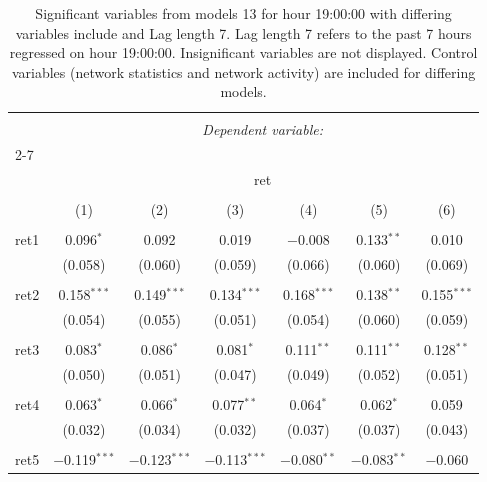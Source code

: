 
\begin{table}[!htbp] \centering 
  \caption{Significant variables from models 13 for hour 19:00:00 with differing variables include 
                               and Lag length 7. Lag length 7 refers to the past 7 hours regressed on hour 19:00:00. 
                               Insignificant variables are not displayed. 
                               Control variables (network statistics and network activity) are 
                               included for differing models.} 
  \label{RVmodels1_t_hourlagged6} 
\scriptsize 
\begin{tabular}{@{\extracolsep{5pt}}lcccccc} 
\\[-1.8ex]\hline 
\hline \\[-1.8ex] 
 & \multicolumn{6}{c}{\textit{Dependent variable:}} \\ 
\cline{2-7} 
\\[-1.8ex] & \multicolumn{6}{c}{ret} \\ 
\\[-1.8ex] & (1) & (2) & (3) & (4) & (5) & (6)\\ 
\hline \\[-1.8ex] 
 ret1 & 0.096$^{*}$ & 0.092 & 0.019 & $-$0.008 & 0.133$^{**}$ & 0.010 \\ 
  & (0.058) & (0.060) & (0.059) & (0.066) & (0.060) & (0.069) \\ 
  & & & & & & \\ 
 ret2 & 0.158$^{***}$ & 0.149$^{***}$ & 0.134$^{***}$ & 0.168$^{***}$ & 0.138$^{**}$ & 0.155$^{***}$ \\ 
  & (0.054) & (0.055) & (0.051) & (0.054) & (0.060) & (0.059) \\ 
  & & & & & & \\ 
 ret3 & 0.083$^{*}$ & 0.086$^{*}$ & 0.081$^{*}$ & 0.111$^{**}$ & 0.111$^{**}$ & 0.128$^{**}$ \\ 
  & (0.050) & (0.051) & (0.047) & (0.049) & (0.052) & (0.051) \\ 
  & & & & & & \\ 
 ret4 & 0.063$^{*}$ & 0.066$^{*}$ & 0.077$^{**}$ & 0.064$^{*}$ & 0.062$^{*}$ & 0.059 \\ 
  & (0.032) & (0.034) & (0.032) & (0.037) & (0.037) & (0.043) \\ 
  & & & & & & \\ 
 ret5 & $-$0.119$^{***}$ & $-$0.123$^{***}$ & $-$0.113$^{***}$ & $-$0.080$^{**}$ & $-$0.083$^{**}$ & $-$0.060 \\ 

\end{tabular}
\end{table}
